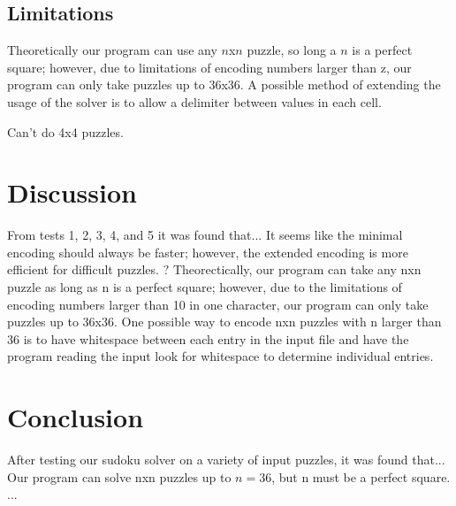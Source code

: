 \documentclass[conference,draftclsnofoot]{IEEEtran}
\begin{document}
\subsection{Limitations}
Theoretically our program can use any $n$x$n$ puzzle, so long a $n$ is a
perfect square; however, due to limitations of encoding numbers larger than z,
our program can only take puzzles up to 36x36. A possible method of extending
the usage of the solver is to allow a delimiter between values in each cell.


Can't do 4x4 puzzles.

\section{Discussion}
From tests 1, 2, 3, 4, and 5 it was found that...  It seems like the minimal
encoding should always be faster; however, the extended encoding is more
efficient for difficult puzzles. \(?\)
Theorectically, our program can take any nxn puzzle as long as n is a perfect
square; however, due to the limitations of encoding numbers larger than 10 in
one character, our program can only take puzzles up to 36x36. One possible way
to encode nxn puzzles with n larger than 36 is to have whitespace between each
entry in the input file and have the program reading the input look for
whitespace to determine individual entries.

\section{Conclusion}
After testing our sudoku solver on a variety of input puzzles, it was found
that...  Our program can solve nxn puzzles up to $n=36$, but n must be a
perfect square.  ...
\end{document}
